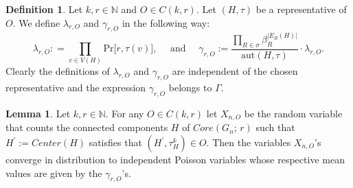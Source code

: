 \documentclass[12pt,notitlepage,a4paper]{article}
\theoremstyle{definition}
\newtheorem{lemma}{Lemma}[section]
\newtheorem{definition}{Definition}[section]
\newcommand{\N}{\mathbb{N}}
\newcommand{\aut}{\mathrm{aut}}
\begin{document}
\begin{definition} Let $k,r\in \N$ and $O\in C(k,r)$.
	Let $(H,\tau)$ be
	a representative of $O$.
	We define $\lambda_{r,O}$ and 
	$\gamma_{r,O}$ in the following way:
	\[ 
	\lambda_{r,O}:
	=\prod_{v\in V(H)}
	\mathrm{Pr} \big[ r, \tau(v) \big],
	\quad 
	\text{ and } \quad
	\gamma_{r,O}:=
	\frac{\prod_{R\in \sigma} \beta_R^{|E_R(H)|}}
	{\aut(H,\tau)}\cdot\lambda_{r,O}.
	\]	
	Clearly the definitions of $\lambda_{r,O}$ and $\gamma_{r,O}$
	are independent of the chosen representative and
	the expression $\gamma_{r,O}$ belongs to $\Gamma$.
\end{definition}

\begin{lemma}
	Let $k,r\in \N$. For any $O\in C(k,r)$ let $X_{n,O}$ be
	the random variable that counts the connected components
	$H$ of $Core(G_n;\, r)$ such that $H^\prime:=Center(H)$
	satisfies that $(H^\prime, \tau^k_{H})\in O$. Then the variables
	$X_{n,O}$'s converge in distribution to independent 
	Poisson variables whose respective mean values are given by the 
	$\gamma_{r,O}$'s.
\end{lemma}
\end{document}

